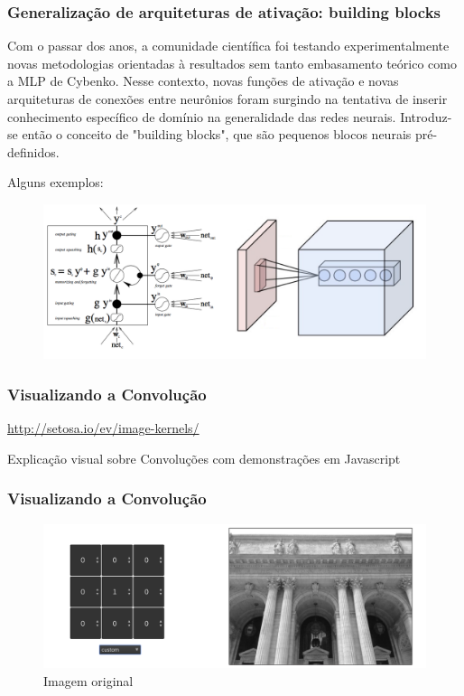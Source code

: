 \documentclass[tikz,10pt]{beamer}
\begin{document}
\begin{frame}
	\frametitle{Generalização de arquiteturas de ativação: building blocks}
	
Com o passar dos anos, a comunidade científica foi testando experimentalmente novas metodologias orientadas à     resultados sem tanto embasamento teórico como a MLP de Cybenko. Nesse contexto, novas funções de ativação e       novas arquiteturas de conexões entre neurônios foram surgindo na tentativa de inserir conhecimento específico     de domínio na generalidade das redes neurais. Introduz-se então o conceito de "building blocks", que são pequenos blocos neurais pré-definidos.

Alguns exemplos:
	 \begin{figure}
	\centering
	\includegraphics[scale=0.3]{blocks.png}
	\end{figure}
\end{frame}


\begin{frame}
	\frametitle{Visualizando a Convolução}
	\centering
	\par \url{http://setosa.io/ev/image-kernels/}
	\par Explicação visual sobre Convoluções com demonstrações em Javascript
\end{frame}



\begin{frame}
	\frametitle{Visualizando a Convolução}
	\centering
\begin{figure}
	\centering
	\includegraphics[width=1.0\linewidth]{images/convolucao/001_sem_filtro}
	\caption{Imagem original}
	\label{fig:001semfiltro}
\end{figure}

\end{frame}
\end{document}
